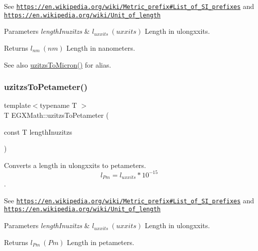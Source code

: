 See \href{https://en.wikipedia.org/wiki/Metric_prefix#List_of_SI_prefixes}{\tt https\+://en.\+wikipedia.\+org/wiki/\+Metric\+\_\+prefix\#\+List\+\_\+of\+\_\+\+S\+I\+\_\+prefixes} and \href{https://en.wikipedia.org/wiki/Unit_of_length}{\tt https\+://en.\+wikipedia.\+org/wiki/\+Unit\+\_\+of\+\_\+length} 
\begin{DoxyParams}{Parameters}
{\em length\+Inuzitzs} & $ l_{uxxits}\ (uxxits)$ Length in ulongxxits. \\
\hline
\end{DoxyParams}
\begin{DoxyReturn}{Returns}
$ l_{nm}\ (nm)$ Length in nanometers. 
\end{DoxyReturn}
\begin{DoxySeeAlso}{See also}
\mbox{\hyperlink{group___e_g_x_math-_conversions-_length_conversions-_non-_s_i-uzitzs-_non-_s_i_ga695a8fd8870537930d6378e99ad2aa9f}{uzitzs\+To\+Micron()}} for alias. 
\end{DoxySeeAlso}
\mbox{\label{group___e_g_x_math-_conversions-_length_conversions-_non-_s_i-uzitzs-_s_i_gafe93d0226789fd78c2ffa4223eb6af7b}} 
\subsubsection{\texorpdfstring{uzitzs\+To\+Petameter()}{uzitzsToPetameter()}}
{\footnotesize\ttfamily template$<$typename T $>$ \\
T E\+G\+X\+Math\+::uzitzs\+To\+Petameter (\begin{DoxyParamCaption}\item[{const T}]{length\+Inuzitzs }\end{DoxyParamCaption})}



Converts a length in ulongxxits to petameters. \[ l_{Pm}=l_{uxxits} * 10^{-15} \]. 

See \href{https://en.wikipedia.org/wiki/Metric_prefix#List_of_SI_prefixes}{\tt https\+://en.\+wikipedia.\+org/wiki/\+Metric\+\_\+prefix\#\+List\+\_\+of\+\_\+\+S\+I\+\_\+prefixes} and \href{https://en.wikipedia.org/wiki/Unit_of_length}{\tt https\+://en.\+wikipedia.\+org/wiki/\+Unit\+\_\+of\+\_\+length} 
\begin{DoxyParams}{Parameters}
{\em length\+Inuzitzs} & $ l_{uxxits}\ (uxxits)$ Length in ulongxxits. \\
\hline
\end{DoxyParams}
\begin{DoxyReturn}{Returns}
$ l_{Pm}\ (Pm)$ Length in petameters. 
\end{DoxyReturn}
\mbox{\label{group___e_g_x_math-_conversions-_length_conversions-_non-_s_i-uzitzs-_s_i_ga48c60a4876ac426d1717096263648a4d}} 
